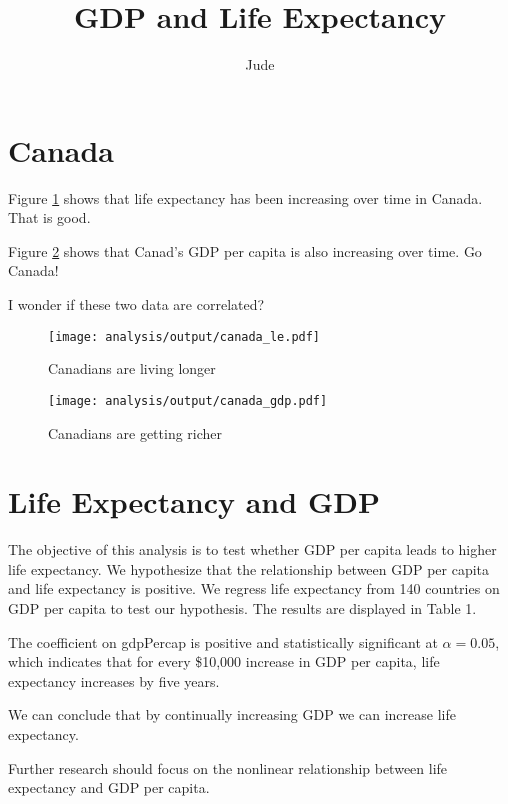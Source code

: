 \documentclass[11pt]{article} %
\title{GDP and Life Expectancy}
\author{Jude}
\begin{document}
\maketitle

\section{Canada}

Figure \ref{fig:le} shows that life expectancy has been increasing over time in Canada.  That is good.  

Figure \ref{fig:gdp} shows that Canad's GDP per capita is also increasing over time.  Go Canada!  

I wonder if these two data are correlated?

\begin{figure}
\caption{Canadians are living longer }
\label{fig:le}
\centering
\texttt{[image: analysis/output/canada\_le.pdf]}
\end{figure}



\begin{figure}
\caption{Canadians are getting richer}
\label{fig:gdp}
\centering
\texttt{[image: analysis/output/canada\_gdp.pdf]}
\end{figure}




\section{Life Expectancy and GDP}

The objective of this analysis is to test whether GDP per capita leads to higher life expectancy.  We hypothesize that the relationship between GDP per capita and life expectancy is positive.  We regress life expectancy from 140 countries on GDP per capita to test our hypothesis.  The results are displayed in Table 1.




The coefficient on gdpPercap is positive and statistically significant at $\alpha=0.05$, which indicates that for every \$10,000 increase in GDP per capita, life expectancy increases by five years.  

We can conclude that by continually increasing GDP we can increase life expectancy.

Further research should focus on the nonlinear relationship between life expectancy and GDP per capita.
\end{document}
